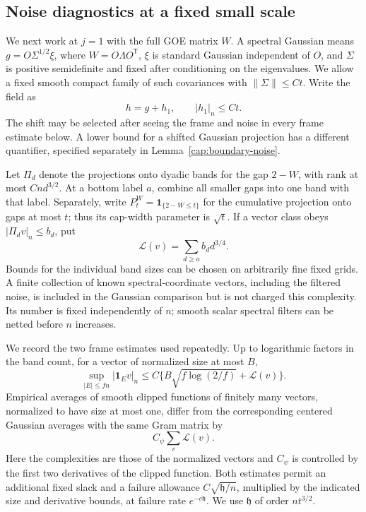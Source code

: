 \subsection{Noise diagnostics at a fixed small scale}

We next work at $j=1$ with the full GOE matrix $W$. A spectral Gaussian means
$g=O\Sigma^{1/2}\xi$, where $W=O\Lambda O^{\mathsf T}$, $\xi$ is standard
Gaussian independent of $O$, and $\Sigma$ is positive semidefinite and fixed
after conditioning on the eigenvalues. We allow a fixed smooth compact family
of such covariances with $\|\Sigma\|\le Ct$. Write the field as
\begin{equation}\label{cap:boundary-field}
 h=g+h_1,\qquad |h_1|_n\le Ct.
\end{equation}
The shift may be selected after seeing the frame and noise in every frame
estimate below. A lower bound for a shifted Gaussian projection has a
different quantifier, specified separately in Lemma~\ref{cap:boundary-noise}.

Let $\Pi_d$ denote the projections onto dyadic bands for the gap $2-W$, with rank at most
$Cnd^{3/2}$. At a bottom label $a$, combine all smaller gaps into one band
with that label. Separately, write $P_t^W=\mathbf1_{\{2-W\le t\}}$ for
the cumulative projection onto gaps at most $t$; thus its cap-width parameter
is $\sqrt t$. If a vector class obeys $|\Pi_d v|_n\le b_d$, put
\begin{equation}\label{cap:band-complexity}
 \mathscr L(v)=\sum_{d\ge a}b_d d^{3/4}.
\end{equation}
Bounds for the individual band sizes can be chosen on arbitrarily fine fixed
grids. A finite collection of known spectral-coordinate vectors, including the
filtered noise, is included in the Gaussian comparison but is not charged this
complexity. Its number is fixed independently of $n$; smooth scalar spectral
filters can be netted before $n$ increases.

We record the two frame estimates used repeatedly.  Up to logarithmic
factors in the band count, for a vector of normalized size at most $B$,
\begin{equation}\label{cap:sparse-restriction}
 \sup_{|E|\le fn}|\mathbf1_Ev|_n
 \le C\{B\sqrt{f\log(2/f)}+\mathscr L(v)\}.
\end{equation}
Empirical averages of smooth clipped functions of finitely many vectors,
normalized to have size at most one, differ from the corresponding centered
Gaussian averages with the same Gram matrix by
\begin{equation}\label{cap:frame-comparison}
 C_\psi\sum_v\mathscr L(v).
\end{equation}
Here the complexities are those of the normalized vectors and $C_\psi$ is
controlled by the first two derivatives of the clipped function. Both
estimates permit an additional fixed slack and a failure allowance
$C\sqrt{\mathfrak h/n}$, multiplied by the indicated size and derivative
bounds, at failure rate $e^{-c\mathfrak h}$. We use $\mathfrak h$ of order
$nt^{3/2}$.

